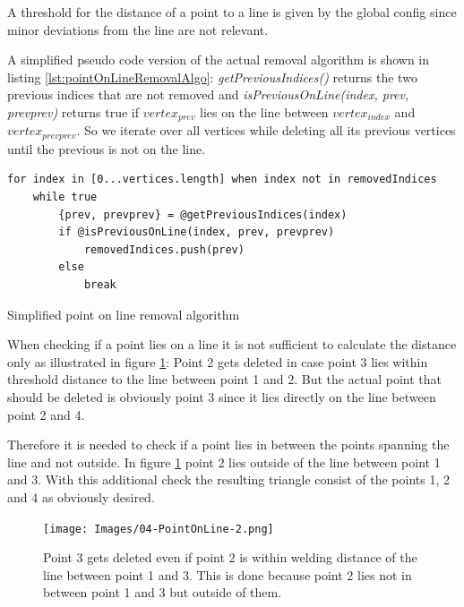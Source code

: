 \documentclass[../ClassicThesis.tex]{subfiles}
\begin{document}
A threshold for the distance of a point to a line is given by the global config since minor deviations from the line are not relevant.

A simplified pseudo code version of the actual removal algorithm is shown in listing \ref{lst:pointOnLineRemovalAlgo}: \emph{getPreviousIndices()} returns the two previous indices that are not removed and \emph{isPreviousOnLine(index, prev, prevprev)} returns true if $ vertex_{prev}$ lies on the line between $vertex_{index}$ and $vertex_{prevprev}$. So we iterate over all vertices while deleting all its previous vertices until the previous is not on the line.

\begin{listing}[!h]
\centering
\begin{verbatim}
for index in [0...vertices.length] when index not in removedIndices
    while true
        {prev, prevprev} = @getPreviousIndices(index)
        if @isPreviousOnLine(index, prev, prevprev)
            removedIndices.push(prev)
        else
            break
\end{verbatim}
\caption{Simplified point on line removal algorithm}
\label{lst:pointOnLineRemovalAlgo}
\end{listing}


When checking if a point lies on a line it is not sufficient to calculate the distance only as illustrated in figure \ref{fig:pointOnLine2}: Point 2 gets deleted in case point 3 lies within threshold distance to the line between point 1 and 2. But the actual point that should be deleted is obviously point 3 since it lies directly on the line between point 2 and 4.

Therefore it is needed to check if a point lies in between the points spanning the line and not outside. In figure \ref{fig:pointOnLine2} point 2 lies outside of the line between point 1 and 3. With this additional check the resulting triangle consist of the points 1, 2 and 4 as obviously desired.


\begin{figure}
    \texttt{[image: Images/04-PointOnLine-2.png]}
    \caption{Point 3 gets deleted even if point 2 is within welding distance of the line between point 1 and 3. This is done because point 2 lies not in between point 1 and 3 but outside of them.}
    \label{fig:pointOnLine2}
\end{figure}




\end{document}
